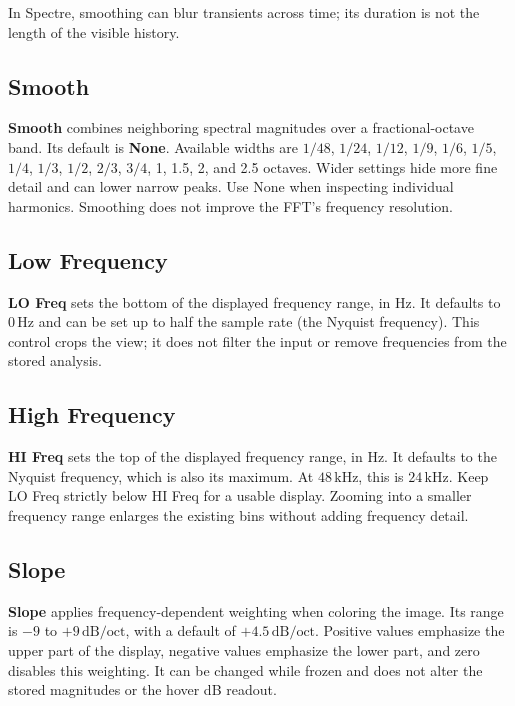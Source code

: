 \documentclass[12pt,letterpaper]{article}
\begin{document}
In Spectre, smoothing can blur transients across time; its duration is not the
length of the visible history.

\clearpage
\subsection{Smooth}

\textbf{Smooth} combines neighboring spectral magnitudes over a
fractional-octave band. Its default is \textbf{None}. Available widths are
$1/48$, $1/24$, $1/12$, $1/9$, $1/6$, $1/5$, $1/4$, $1/3$, $1/2$, $2/3$,
$3/4$, 1, 1.5, 2, and 2.5 octaves. Wider settings hide more fine detail and
can lower narrow peaks. Use None when inspecting individual harmonics.
Smoothing does not improve the FFT's frequency resolution.

\subsection{Low Frequency}

\textbf{LO Freq} sets the bottom of the displayed frequency range, in Hz. It
defaults to $0\,\mathrm{Hz}$ and can be set up to half the sample rate (the
Nyquist frequency). This control crops the view; it does not filter the input
or remove frequencies from the stored analysis.

\subsection{High Frequency}

\textbf{HI Freq} sets the top of the displayed frequency range, in Hz. It
defaults to the Nyquist frequency, which is also its maximum. At
$48\,\mathrm{kHz}$, this is $24\,\mathrm{kHz}$. Keep LO Freq strictly below HI
Freq for a usable display. Zooming into a smaller frequency range enlarges the
existing bins without adding frequency detail.

\subsection{Slope}

\textbf{Slope} applies frequency-dependent weighting when coloring the image.
Its range is $-9$ to $+9\,\mathrm{dB/oct}$, with a default of
$+4.5\,\mathrm{dB/oct}$. Positive values emphasize the upper part of the
display, negative values emphasize the lower part, and zero disables this
weighting. It can be changed while frozen and does not alter the stored
magnitudes or the hover dB readout.
\end{document}
